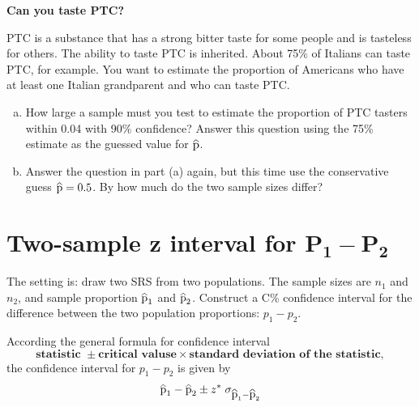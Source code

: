 \documentclass[a4paper, 12pt,twoside]{book}
\newcommand\reallywidehat[1]{%
\savestack{\tmpbox}{\stretchto{%
  \scaleto{%
    \scalerel*[\widthof{\ensuremath{#1}}]{\kern-.6pt\bigwedge\kern-.6pt}%
    {\rule[-\textheight/2]{1ex}{\textheight}}%
  }{\textheight}%
}{0.5ex}}%
\stackon[1pt]{#1}{\tmpbox}%
}
\begin{document}
\colorbox{champagne}{\parbox{\textwidth}{
\textbf{Can you taste PTC?}\vspace{0.3cm}

 PTC is a substance that has a strong bitter taste for some people and is tasteless for others. The ability to taste PTC is inherited. About 75\% of Italians can taste PTC, for example. You want to estimate the proportion of Americans who have at least one Italian grandparent and who can taste PTC. 
 
 \begin{enumerate}[(a)]
     \item How large a sample must you test to estimate the proportion of PTC tasters within 0.04 with 90\% confidence? Answer this question using the 75\% estimate as the guessed value for $\reallywidehat{p}$.
     \item Answer the question in part (a) again, but this time use the conservative guess $\reallywidehat{p} = 0.5$. By how much do the two sample sizes differ?
 \end{enumerate}
}}
\newpage

\section{Two-sample z interval for $\mathbf{P_1- P_2}$}
The setting is: draw two SRS from two populations. The sample sizes are  $n_1$ and $n_2$, and sample proportion $\reallywidehat{p}_1$ and $\reallywidehat{p}_2$. Construct a C\% confidence interval for the difference between the two population proportions: $p_1-p_2$.\vspace{0.3cm}

 According the general formula for confidence interval 
 $$\textbf{statistic }\pm \textbf{critical valuse} \times \textbf{standard deviation of the statistic}, $$
 the confidence interval for $p_1-p_2$ is given by
 $$\reallywidehat{p}_1 - \reallywidehat{p}_2 \pm z^*\; \sigma_{\reallywidehat{p}_1 - \reallywidehat{p}_2 }$$
 
\end{document}
